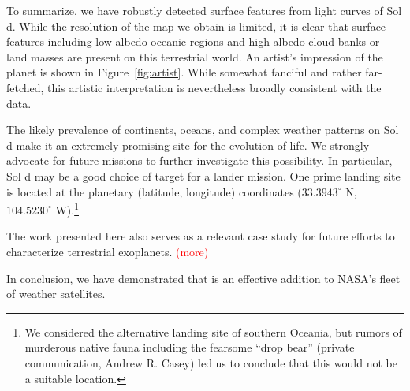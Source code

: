 \documentclass[modern]{aastex62}
\newcommand{\todo}[1]{\textcolor{red}{#1}}
\begin{document}
To summarize, we have robustly detected surface features from \TESS 
light curves of Sol d. While the resolution of the map we obtain is limited, 
it is clear that surface features including low-albedo oceanic regions and 
high-albedo cloud banks or land masses are present on this terrestrial 
world. An artist's impression of the planet is shown in Figure~\ref{fig:artist}. 
While somewhat fanciful and rather far-fetched, this artistic interpretation 
is nevertheless broadly consistent with the data.

The likely prevalence of continents, oceans, and complex weather patterns 
on Sol d make it an extremely promising site for the evolution of life. 
We strongly advocate for future missions to further investigate this possibility. 
In particular, Sol d may be a good choice of target for a lander mission. 
One prime landing site is located at the planetary (latitude, longitude) coordinates 
($33.3943^\circ$ N, $104.5230^\circ$ W).\footnote{We considered the alternative landing site of southern Oceania, but rumors of murderous native fauna including the fearsome ``drop bear'' (private communication, Andrew R. Casey) led us to conclude that this would not be a suitable location.} 

The work presented here also serves as a relevant case study for future 
efforts to characterize terrestrial exoplanets. \todo{(more)}

In conclusion, we have demonstrated that \TESS is an effective addition to NASA's fleet of weather satellites.



\newpage

\end{document}
